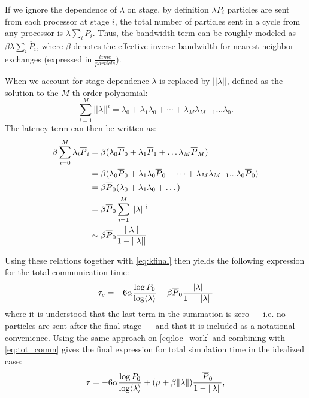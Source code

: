 If we ignore the dependence of $\lambda$ on stage, by definition $\lambda
\overline{P}_i$ particles are sent from each processor at stage $i$, the total
number of particles sent in a cycle from any processor is $\lambda \sum_i
\overline{P}_i$. Thus, the bandwidth term can be roughly modeled as $\beta
\lambda \sum_i \overline{P}_i$, where $\beta$ denotes the effective inverse
bandwidth for nearest-neighbor exchanges (expressed in $\frac{time}{particle}$).

When we account for stage dependence $\lambda$ is replaced by $||\lambda||$,
defined as the solution to the $M$-th order polynomial:
\begin{equation}
  \label{eq:lmean}
  \sum_{i=1}^M ||\lambda||^i = \lambda_0 + \lambda_1\lambda_0 + \cdots +
  \lambda_M\lambda_{M-1}...\lambda_0.
\end{equation}
The latency term can then be written as:
\begin{align*}
  \beta \sum_{i=0}^M \lambda_i \overline{P}_i &= \beta(\lambda_0 \overline{P}_0
  + \lambda_1 \overline{P}_1 + \dots \lambda_M\overline{P}_M)  \\
  &= \beta(\lambda_0 \overline{P}_0 + \lambda_1 \lambda_0 \overline{P}_0 + \dots +
  \lambda_M\lambda_{M-1}...\lambda_0 \overline{P}_0) \\
  &=\beta\overline{P}_0(\lambda_0 + \lambda_1\lambda_0 + \dots) \\
  &= \beta\overline{P}_0\sum_{i=1}^M ||\lambda||^i  \\
  &\sim \beta\overline{P}_0\frac{||\lambda||}{1-||\lambda||}
\end{align*}

Using these relations together with \eqref{eq:kfinal} then yields the following
expression for the total communication time:
\begin{equation}
  \label{eq:tot_comm}
  \tau_c = -6 \alpha \frac{\log P_0}{\log \langle \lambda \rangle} +
  \beta\overline{P}_0\frac{||\lambda||}{1-||\lambda||}
\end{equation}
where it is understood that the last term in the summation is zero --- i.e. no
particles are sent after the final stage --- and that it is included as a
notational convenience.  Using the same approach on \eqref{eq:loc_work} and
combining with \eqref{eq:tot_comm} gives the final expression for total
simulation time in the idealized case:
\begin{equation}
  \label{eq:tau1}
  \tau = -6 \alpha \frac{\log P_0}{\log \langle \lambda \rangle} + (\mu + \beta
  \| \lambda \|)\frac{\overline{P}_0}{1-\| \lambda \|},
\end{equation}

